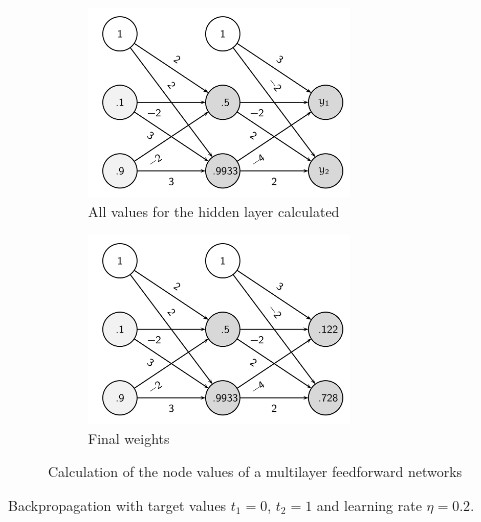 \documentclass[11pt]{article}
\begin{document}
\begin{figure}[tbh!]
    \begin{subfigure}{0.45\linewidth}
        \centering
        \includegraphics[keepaspectratio, height=5cm]{Pictures/multilayer_feedforward_example_04}
        \caption{All values for the hidden layer calculated}
    \end{subfigure}
    \begin{subfigure}{0.45\linewidth}
        \centering
        \includegraphics[keepaspectratio, height=5cm]{Pictures/multilayer_feedforward_example_05}
        \caption{Final weights}
    \end{subfigure}
    \caption{Calculation of the node values of a multilayer feedforward networks}
    \label{fig:feedforwardnetworks}
\end{figure}

\noindent
Backpropagation with target values $t_1 = 0$, $t_2 = 1$ and learning rate $\eta = 0.2$.
\end{document}

